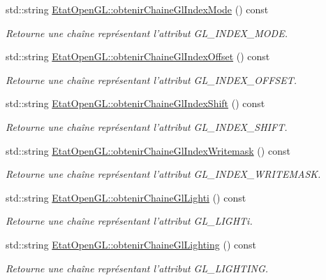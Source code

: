 \begin{DoxyCompactItemize}
std\-::string \hyperlink{group__utilitaire_ga5413d656a860db0103e85dcd025970e8}{Etat\-Open\-G\-L\-::obtenir\-Chaine\-Gl\-Index\-Mode} () const 
\begin{DoxyCompactList}\small\item\em Retourne une chaîne représentant l'attribut G\-L\-\_\-\-I\-N\-D\-E\-X\-\_\-\-M\-O\-D\-E. \end{DoxyCompactList}\item 
std\-::string \hyperlink{group__utilitaire_ga2ef77a1752dfc7df305e66d9ebc8fee0}{Etat\-Open\-G\-L\-::obtenir\-Chaine\-Gl\-Index\-Offset} () const 
\begin{DoxyCompactList}\small\item\em Retourne une chaîne représentant l'attribut G\-L\-\_\-\-I\-N\-D\-E\-X\-\_\-\-O\-F\-F\-S\-E\-T. \end{DoxyCompactList}\item 
std\-::string \hyperlink{group__utilitaire_gabb665544045af095c7c301467b71a53d}{Etat\-Open\-G\-L\-::obtenir\-Chaine\-Gl\-Index\-Shift} () const 
\begin{DoxyCompactList}\small\item\em Retourne une chaîne représentant l'attribut G\-L\-\_\-\-I\-N\-D\-E\-X\-\_\-\-S\-H\-I\-F\-T. \end{DoxyCompactList}\item 
std\-::string \hyperlink{group__utilitaire_ga7041e09cfd847b59e2fd8b306639b2e2}{Etat\-Open\-G\-L\-::obtenir\-Chaine\-Gl\-Index\-Writemask} () const 
\begin{DoxyCompactList}\small\item\em Retourne une chaîne représentant l'attribut G\-L\-\_\-\-I\-N\-D\-E\-X\-\_\-\-W\-R\-I\-T\-E\-M\-A\-S\-K. \end{DoxyCompactList}\item 
std\-::string \hyperlink{group__utilitaire_ga373300784f0f42aea9a0d6c78cb01623}{Etat\-Open\-G\-L\-::obtenir\-Chaine\-Gl\-Lighti} () const 
\begin{DoxyCompactList}\small\item\em Retourne une chaîne représentant l'attribut G\-L\-\_\-\-L\-I\-G\-H\-Ti. \end{DoxyCompactList}\item 
std\-::string \hyperlink{group__utilitaire_gac26fe35af4bad0a50b4890f21e61ea02}{Etat\-Open\-G\-L\-::obtenir\-Chaine\-Gl\-Lighting} () const 
\begin{DoxyCompactList}\small\item\em Retourne une chaîne représentant l'attribut G\-L\-\_\-\-L\-I\-G\-H\-T\-I\-N\-G. \end{DoxyCompactList}\item 

\end{DoxyCompactItemize}
